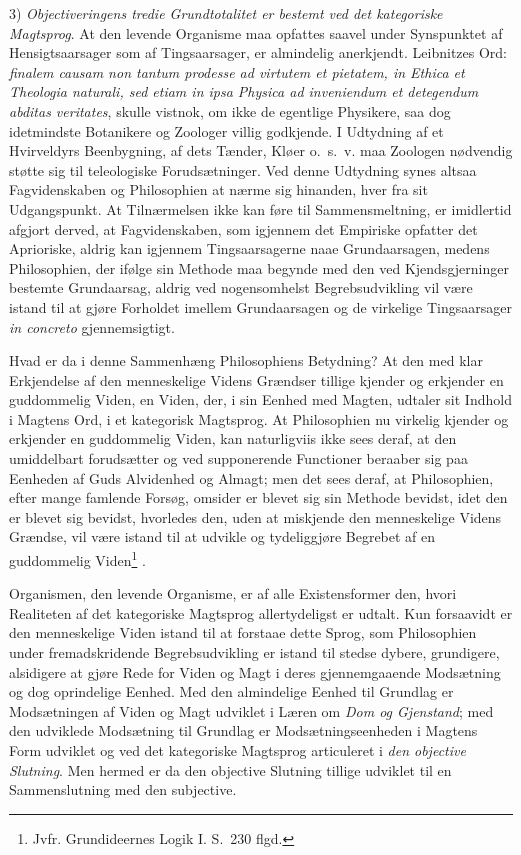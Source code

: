 \documentclass[12pt]{book}
\newcommand{\opage}[1]{\marginnote{\footnotesize\textit{[#1]}}}
\begin{document}
3) \emph{Objectiveringens tredie Grundtotalitet er bestemt ved det kategoriske Magtsprog}. At den levende Organisme maa opfattes saavel under Synspunktet af Hensigtsaarsager som af Tingsaarsager, er almindelig anerkjendt. Leibnitzes Ord: \textit{finalem causam non tantum prodesse ad virtutem et pietatem, in Ethica et Theologia naturali, sed etiam in ipsa Physica ad inveniendum et detegendum abditas veritates}, skulle vistnok, om ikke de egentlige Physikere, saa dog idetmindste Botanikere og Zoologer villig godkjende. I Udtydning af et Hvirveldyrs Beenbygning, af dets Tænder, Kløer o.~s.~v. maa Zoologen nødvendig støtte sig til teleologiske Forudsætninger. Ved denne Udtydning synes altsaa Fagvidenskaben og Philosophien at nærme sig hinanden, hver fra sit Udgangspunkt. At Tilnærmelsen ikke kan føre til Sammensmeltning, er imidlertid afgjort derved, at Fagvidenskaben, som igjennem det Empiriske opfatter det Aprioriske, aldrig kan igjennem Tingsaarsagerne naae Grundaarsagen, medens Philosophien, der ifølge sin Methode maa begynde med den ved Kjendsgjerninger bestemte Grundaarsag, aldrig
\opage{433}ved nogensomhelst Begrebsudvikling vil være istand til at gjøre Forholdet imellem Grundaarsagen og de virkelige Tingsaarsager \textit{in concreto} gjennemsigtigt.

Hvad er da i denne Sammenhæng Philosophiens Betydning? At den med klar Erkjendelse af den menneskelige Videns Grændser tillige kjender og erkjender en guddommelig Viden, en Viden, der, i sin Eenhed med Magten, udtaler sit Indhold i Magtens Ord, i et kategorisk Magtsprog. At Philosophien nu virkelig kjender og erkjender en guddommelig Viden, kan naturligviis ikke sees deraf, at den umiddelbart forudsætter og ved supponerende Functioner beraaber sig paa Eenheden af Guds Alvidenhed og Almagt; men det sees deraf, at Philosophien, efter mange famlende Forsøg, omsider er blevet sig sin Methode bevidst, idet den er blevet sig bevidst, hvorledes den, uden at miskjende den menneskelige Videns Grændse, vil være istand til at udvikle og tydeliggjøre Begrebet af en guddommelig Viden\footnote{Jvfr. Grundideernes Logik I. S.~230 flgd.}%
.

Organismen, den levende Organisme, er af alle Existensformer den, hvori Realiteten af det kategoriske Magtsprog allertydeligst er udtalt. Kun forsaavidt er den menneskelige Viden istand til at forstaae dette Sprog, som Philosophien under fremadskridende Begrebsudvikling er istand til stedse dybere, grundigere, alsidigere at gjøre Rede for Viden og Magt i deres gjennemgaaende Modsætning og dog oprindelige Eenhed. Med den almindelige Eenhed til Grundlag er Modsætningen af Viden og Magt udviklet i Læren om \emph{Dom og Gjenstand}; med den udviklede Modsætning til Grundlag er Modsætningseenheden i Magtens Form udviklet og ved det kategoriske Magtsprog articuleret i \emph{den objective Slutning}. Men hermed er da den objective Slutning tillige udviklet til en Sammenslutning med den subjective.
\end{document}

